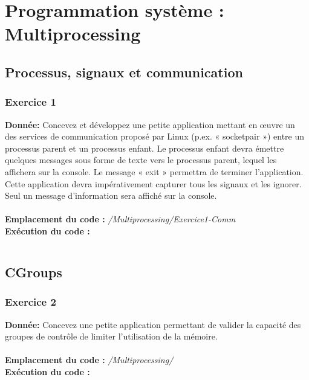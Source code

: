\section{Programmation système : Multiprocessing}
\subsection{Processus, signaux et communication}
\subsubsection{Exercice 1}
\textbf{Donnée:} Concevez	et	développez	une	petite	application	mettant	en	œuvre	un	des	services	de	communication
proposé	par	Linux	(p.ex.	« socketpair ») entre	un	processus	parent	et	un	processus	enfant.	
Le	processus	enfant	devra	émettre	quelques	messages	sous	forme	de	texte	vers	le	processus	parent,	
lequel	les	affichera	sur	la	console.	Le	message	« exit »	permettra	de	terminer	l’application.
Cette	application	devra	impérativement	capturer	tous	les	signaux	et	les	ignorer.	Seul	un	message	
d’information	sera	affiché	sur	la	console.\\\\
\textbf{Emplacement du code : } \textit{/Multiprocessing/Exercice1-Comm}\\

\textbf{Exécution du code : } \\
\begin{lstlisting}

\end{lstlisting}

\subsection{CGroups}
\subsubsection{Exercice 2}
\textbf{Donnée:} Concevez	une	petite	application	permettant	de	valider	la	capacité	des	groupes	de	contrôle	de	limiter	
l’utilisation	de	la mémoire.	\\\\

\textbf{Emplacement du code : } \textit{/Multiprocessing/}\\

\textbf{Exécution du code : } \\
\begin{lstlisting}

\end{lstlisting}


